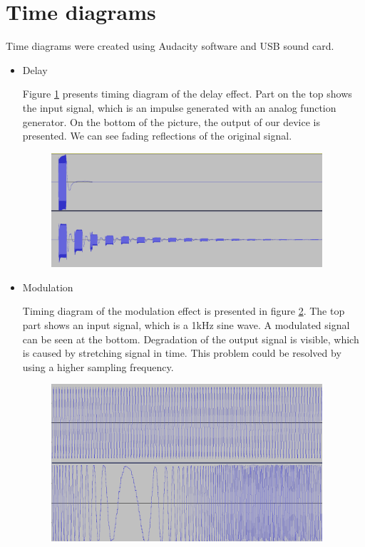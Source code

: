 \documentclass[a4paper,twoside,12pt]{book}
\begin{document}
\section{Time diagrams}
Time diagrams were created using Audacity software and USB sound card.

\begin{itemize}
    \item Delay

    Figure \ref{fig:delay} presents timing diagram of the delay effect.
    Part on the top shows the input signal,
    which is an impulse generated with an analog function generator.
    On the bottom of the picture, the output of our device is presented.
    We can see fading reflections of the original signal.
    
    \begin{figure}[H]
        \centering
        \includegraphics[width=0.95\textwidth]{images/delay}
        \caption{}
        \label{fig:delay}
    \end{figure}
    
    \item Modulation

    Timing diagram of the modulation effect is presented in figure \ref{fig:mod}.
    The top part shows an input signal, which is a 1kHz sine wave.
    A modulated signal can be seen at the bottom.
    Degradation of the output signal is visible,
    which is caused by stretching signal in time.
    This problem could be resolved by using a higher sampling frequency.

    \begin{figure}[H]
        \centering
        \includegraphics[width=0.95\textwidth]{images/modulation2}
        \caption{}
        \label{fig:mod}
    \end{figure}


\end{itemize}
\end{document}
